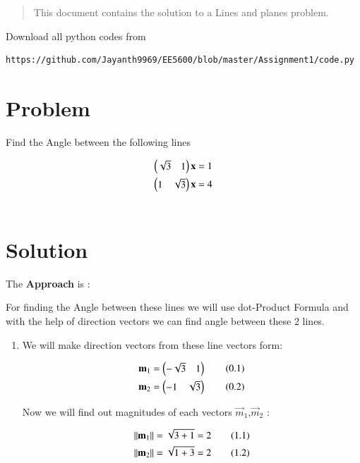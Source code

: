 \begin{enumerate}[label=\thesection.\arabic*.,ref=\thesection.\theenumi]

\begin{abstract}
This document contains the solution to a Lines and planes problem.
\end{abstract}
Download all python codes from 
%
\begin{lstlisting}
https://github.com/Jayanth9969/EE5600/blob/master/Assignment1/code.py
\end{lstlisting}

\section{Problem}



Find the Angle between the following lines

\begin{align*}
  \begin{pmatrix}\sqrt{3}  &  1\end{pmatrix}\mathbf{x}=1
\\
    \begin{pmatrix}1 & \sqrt{3}\end{pmatrix}\mathbf{x}=4
\\ \\
\end{align*}

\section{Solution}
The \textbf{Approach} is :
\begin{flushleft}
    For finding the Angle between these lines we will use dot-Product Formula and with  the help of direction vectors we can find angle between these 2 lines.
\end{flushleft}

\begin{enumerate}
    \item We will make direction vectors from these line vectors form:

\begin{align*}
    \mathbf{m}_1 = \begin{pmatrix}-\sqrt{3} & 1\end{pmatrix}\tag{0.1}\\
    \mathbf{m}_2 = \begin{pmatrix}-1 & \sqrt{3}\end{pmatrix}\tag{0.2}\\
\end{align*} 


Now we will find out magnitudes of each vectors $\vec{m}_1$,$\vec{m}_2$ :

\begin{align*}
    \lVert\mathbf{m}_1\rVert = \sqrt{3+1} = 2\tag{1.1}\\
    \lVert\mathbf{m}_2\rVert = \sqrt{1+3} = 2\tag{1.2}\\
\end{align*}


\end{enumerate}
\end{enumerate}
